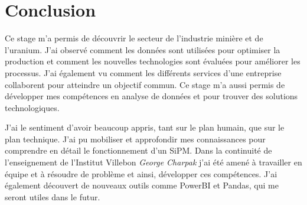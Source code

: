 \section{Conclusion}

Ce stage m'a permis de découvrir le secteur de l'industrie minière et de l'uranium. J'ai observé comment les données sont utilisées pour optimiser la production et comment les nouvelles technologies sont évaluées pour améliorer les processus. J'ai également vu comment les différents services d'une entreprise collaborent pour atteindre un objectif commun. Ce stage m'a aussi permis de développer mes compétences en analyse de données et pour trouver des solutions technologiques.

J'ai le sentiment d'avoir beaucoup appris, tant sur le plan humain, que sur le plan technique. J'ai pu mobiliser et approfondir mes connaissances pour comprendre en détail le fonctionnement d'un SiPM. Dans la continuité de l'enseignement de l'Institut Villebon \textit{George Charpak} j'ai été amené à travailler en équipe et à résoudre de problème et ainsi, développer ces compétences. J'ai également découvert de nouveaux outils comme PowerBI et Pandas, qui me seront utiles dans le futur.